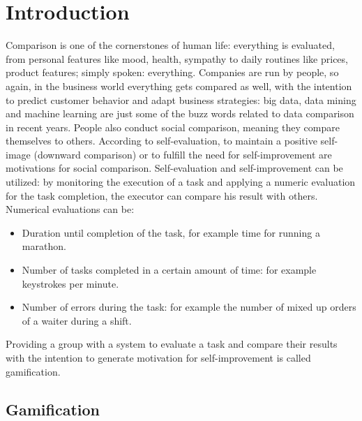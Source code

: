 \tableofcontents
\setcounter{page}{2}
\listoffigures
{\let\clearpage\relax \listoftables}

\glsresetall

\printnoidxglossary[type=\acronymtype,title={List of Acronyms}]

{\let\clearpage\relax \printnoidxglossary[type=symbols,sort=letter]}


\chapter{Introduction} \label{Introduction}


Comparison is one of the cornerstones of human life: everything is evaluated, from personal features like mood, health, sympathy to daily routines like prices, product features; simply spoken: everything. Companies are run by people, so again, in the business world everything gets compared as well, with the intention to predict customer behavior and adapt business strategies: big data, data mining and machine learning are just some of the buzz words related to data comparison in recent years.
People also conduct social comparison, meaning they compare themselves to others. According to \textcite{Corcoran2011} self-evaluation, to maintain a positive self-image (downward comparison) or to fulfill the need for self-improvement are motivations for social comparison.
Self-evaluation and self-improvement can be utilized: by monitoring the execution of a task and applying a numeric evaluation for the task completion, the executor can compare his result with others.
Numerical evaluations can be:
\begin{itemize}
	\item Duration until completion of the task, for example time for running a marathon.
	\item Number of tasks completed in a certain amount of time: for example keystrokes per minute.
	\item Number of errors during the task: for example the number of mixed up orders of a waiter during a shift.
\end{itemize}
Providing a group with a system to evaluate a task and compare their results with the intention to generate motivation for self-improvement is called gamification. 

\section{Gamification} \label{Gamification}

